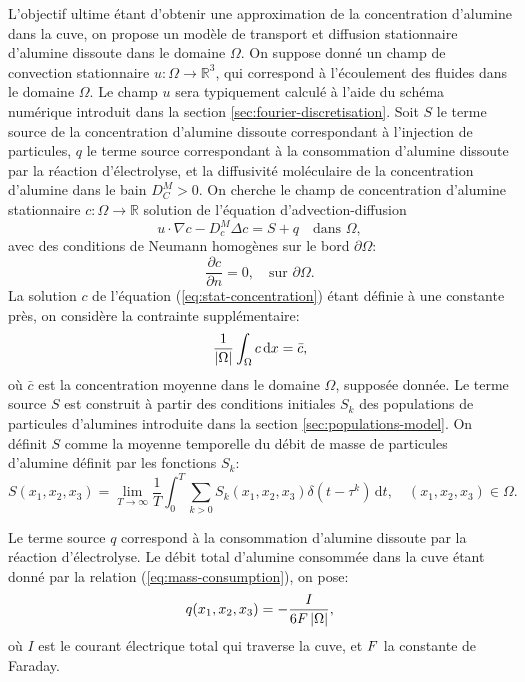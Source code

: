 L'objectif ultime étant d'obtenir une approximation de la
concentration d'alumine dans la cuve, on propose un modèle de
transport et diffusion stationnaire d'alumine dissoute dans le domaine
$\Omega$.  On suppose donné un champ de convection stationnaire
$u:\Omega\to\mathbb R^3$, qui correspond à l'écoulement des fluides
dans le domaine $\Omega$. Le champ $u$ sera typiquement calculé à
l'aide du schéma numérique introduit dans la section
\ref{sec:fourier-discretisation}.  Soit $S$ le terme source de la
concentration d'alumine dissoute correspondant à l'injection de
particules, $q$ le terme source correspondant à la consommation
d'alumine dissoute par la réaction d'électrolyse, et la diffusivité
moléculaire de la concentration d'alumine dans le bain $D_C^M > 0$.
On cherche le champ de concentration d'alumine stationnaire
$c:\Omega\to\mathbb R$ solution de l'équation d'advection-diffusion
\begin{equation}\label{eq:stat-concentration}
  u\cdot \nabla c - D_c^M \Delta c = S + q\quad \text{dans } \Omega,
\end{equation}
avec des conditions de Neumann homogènes sur le bord $\partial
\Omega$:
\begin{equation}
  \frac{\partial c}{\partial n} = 0,\quad\text{sur } \partial \Omega.
\end{equation}
La solution $c$ de l'équation (\ref{eq:stat-concentration}) étant
définie à une constante près, on considère la contrainte
supplémentaire:
\begin{equation}\label{eq:stat-alumina-avg-c}
  \frac{1}{\left\lvert \Omega \right\rvert}\int_\Omega c\,\mathrm dx = \bar c,
\end{equation}
où $\bar c$ est la concentration moyenne dans le domaine $\Omega$,
supposée donnée.
Le terme source $S$ est construit à partir des conditions initiales
$S_k$ des populations de particules d'alumines introduite dans la
section \ref{sec:populations-model}. On définit $S$ comme la moyenne
temporelle du débit de masse de particules d'alumine définit par
les fonctions $S_k$:
\begin{equation}
  S(x_1,x_2,x_3) = \lim_{T\to\infty}\frac{1}{T}\int_0^T \sum_{k>0}
  S_k(x_1, x_2, x_3) \delta(t - \tau^k)\,\mathrm dt, \quad (x_1, x_2, x_3)\in\Omega.
\end{equation}

Le terme source $q$ correspond à la consommation d'alumine
dissoute par la réaction d'électrolyse. Le débit total d'alumine
consommée dans la cuve étant donné par la relation
(\ref{eq:mass-consumption}), on pose:
\begin{equation}\label{eq:stat-alumina-consommation}
  q(x_1, x_2, x_3) = -\frac{I}{6F\left\lvert \Omega \right\rvert},
\end{equation}
où $I$ est le courant électrique total qui traverse la cuve, et
$F$ la constante de Faraday.

